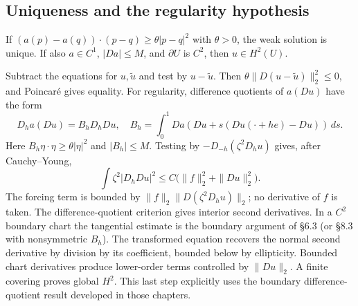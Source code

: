 \subsection{Uniqueness and the regularity hypothesis}
\Needspace{50mm}
\begin{theorem}
If $(a(p)-a(q))\cdot(p-q)\geq\theta|p-q|^2$ with $\theta>0$,
the weak solution is unique. If also $a\in C^1$, $|Da|\leq M$, and
$\partial U$ is $C^2$, then $u\in H^2(U)$.
\end{theorem}
\begin{expandedproof}
Subtract the equations for $u,\tilde u$ and test by $u-\tilde u$.
Then $\theta\|D(u-\tilde u)\|_2^2\leq0$, and Poincar\'e gives equality.
For regularity, difference quotients of $a(Du)$ have the form
\[
 D_h a(Du)=B_hD_hDu,\quad
 B_h=\int_0^1Da(Du+s(Du(\cdot+he)-Du))\,ds.
\]
Here $B_h\eta\cdot\eta\geq\theta|\eta|^2$ and $|B_h|\leq M$.
Testing by $-D_{-h}(\zeta^2D_hu)$ gives, after Cauchy--Young,
\[
 \int\zeta^2|D_hDu|^2\leq C\bigl(\|f\|_2^2+\|Du\|_2^2\bigr).
\]
The forcing term is bounded by $\|f\|_2\|D(\zeta^2D_hu)\|_2$;
no derivative of $f$ is taken. The difference-quotient criterion gives
interior second derivatives. In a $C^2$ boundary chart the tangential
estimate is the boundary argument of \S6.3 (or \S8.3 with nonsymmetric
$B_h$). The transformed equation recovers the normal second derivative
by division by its coefficient, bounded below by ellipticity. Bounded
chart derivatives produce lower-order terms controlled by $\|Du\|_2$.
A finite covering proves global $H^2$. This last step explicitly uses
the boundary difference-quotient result developed in those chapters.
\end{expandedproof}
\Needspace{42mm}
